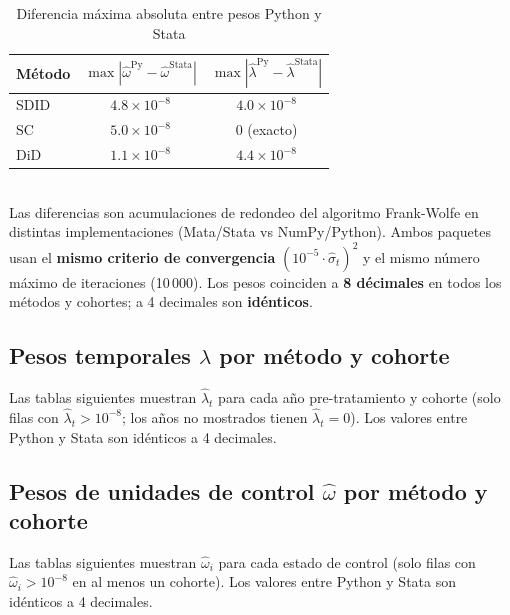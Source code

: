 \documentclass[11pt, a4paper]{article}
\begin{document}
\begin{table}[H]
\centering
\caption{Diferencia m\'axima absoluta entre pesos Python y Stata}
\label{tab:weight_summary}
\begin{tabular}{lcc}
\toprule
M\'etodo & $\max|\hat{\omega}^{\text{Py}} - \hat{\omega}^{\text{Stata}}|$ &
           $\max|\hat{\lambda}^{\text{Py}} - \hat{\lambda}^{\text{Stata}}|$ \\
\midrule
SDID & $4{.}8 \times 10^{-8}$ & $4{.}0 \times 10^{-8}$ \\
SC   & $5{.}0 \times 10^{-8}$ & $0$ (exacto) \\
DiD  & $1{.}1 \times 10^{-8}$ & $4{.}4 \times 10^{-8}$ \\
\bottomrule
\end{tabular}\\[0.4em]
{\small Las diferencias son acumulaciones de redondeo del algoritmo Frank-Wolfe en distintas implementaciones
(Mata/Stata vs NumPy/Python). Ambos paquetes usan el \textbf{mismo criterio de convergencia}
$(10^{-5}\cdot\hat\sigma_t)^2$ y el mismo n\'umero m\'aximo de iteraciones (10\,000).
Los pesos coinciden a \textbf{8 d\'ecimales} en todos los m\'etodos y cohortes; a 4 decimales son \textbf{id\'enticos}.}
\end{table}

\subsection*{Pesos temporales $\hat{\lambda}$ por m\'etodo y cohorte}

Las tablas siguientes muestran $\hat{\lambda}_t$ para cada a\~no pre-tratamiento
y cohorte (solo filas con $\hat{\lambda}_t > 10^{-8}$; los a\~nos no mostrados tienen $\hat{\lambda}_t = 0$).
Los valores entre Python y Stata son id\'enticos a 4 decimales.



\subsection*{Pesos de unidades de control $\hat{\omega}$ por m\'etodo y cohorte}

Las tablas siguientes muestran $\hat{\omega}_i$ para cada estado de control
(solo filas con $\hat{\omega}_i > 10^{-8}$ en al menos un cohorte).
Los valores entre Python y Stata son id\'enticos a 4 decimales.



\newpage
\end{document}
